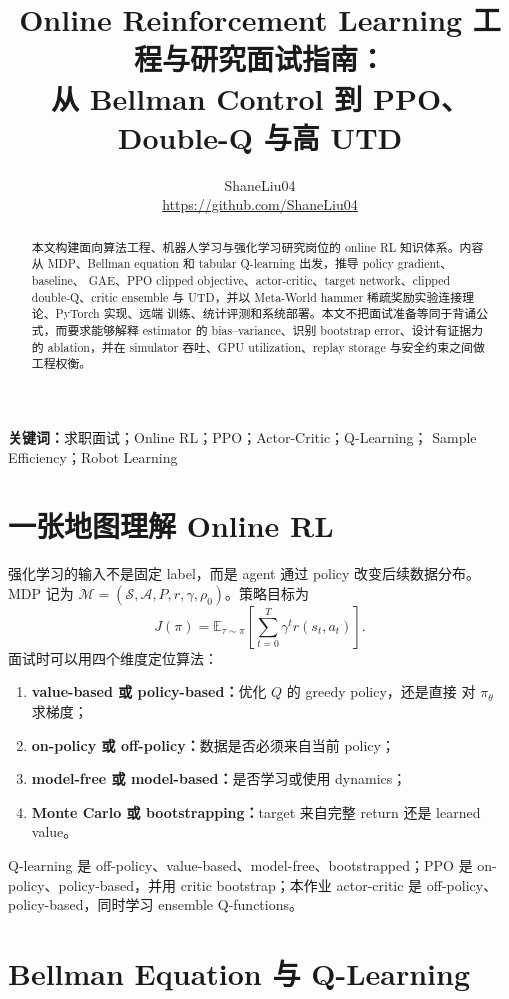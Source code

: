 \documentclass[10pt,twocolumn,a4paper]{ctexart}
\title{\vspace{-1.2em}\textbf{Online Reinforcement Learning 工程与研究面试指南：\\
从 Bellman Control 到 PPO、Double-Q 与高 UTD}}
\author{ShaneLiu04\\
\small\url{https://github.com/ShaneLiu04}}
\date{}
\begin{document}
\maketitle
\thispagestyle{fancy}

\begin{abstract}
本文构建面向算法工程、机器人学习与强化学习研究岗位的 online RL 知识体系。内容从
MDP、Bellman equation 和 tabular Q-learning 出发，推导 policy gradient、baseline、
GAE、PPO clipped objective、actor-critic、target network、clipped double-Q、critic
ensemble 与 UTD，并以 Meta-World hammer 稀疏奖励实验连接理论、PyTorch 实现、远端
训练、统计评测和系统部署。本文不把面试准备等同于背诵公式，而要求能够解释 estimator
的 bias--variance、识别 bootstrap error、设计有证据力的 ablation，并在 simulator
吞吐、GPU utilization、replay storage 与安全约束之间做工程权衡。
\end{abstract}

\textbf{关键词：}求职面试；Online RL；PPO；Actor-Critic；Q-Learning；
Sample Efficiency；Robot Learning

\section{一张地图理解 Online RL}
强化学习的输入不是固定 label，而是 agent 通过 policy 改变后续数据分布。MDP 记为
$\mathcal M=(\mathcal S,\mathcal A,P,r,\gamma,\rho_0)$。策略目标为
\[
J(\pi)=\mathbb E_{\tau\sim\pi}\left[
\sum_{t=0}^{T}\gamma^t r(s_t,a_t)\right].
\]
面试时可以用四个维度定位算法：
\begin{enumerate}
  \item \textbf{value-based 或 policy-based：}优化 $Q$ 的 greedy policy，还是直接
  对 $\pi_\theta$ 求梯度；
  \item \textbf{on-policy 或 off-policy：}数据是否必须来自当前 policy；
  \item \textbf{model-free 或 model-based：}是否学习或使用 dynamics；
  \item \textbf{Monte Carlo 或 bootstrapping：}target 来自完整 return 还是 learned
  value。
\end{enumerate}
Q-learning 是 off-policy、value-based、model-free、bootstrapped；PPO 是
on-policy、policy-based，并用 critic bootstrap；本作业 actor-critic 是 off-policy、
policy-based，同时学习 ensemble Q-functions。

\section{Bellman Equation 与 Q-Learning}
\end{document}
